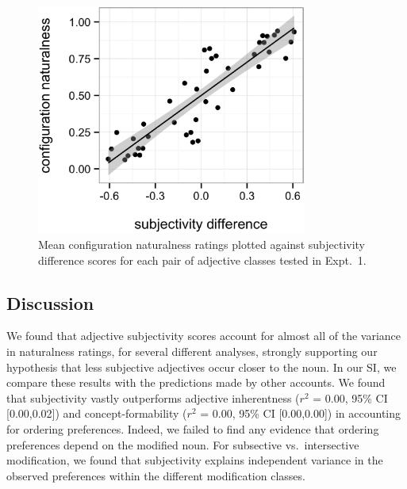 \documentclass[manuscript]{stjour}
\begin{document}
\begin{figure}
	\centering\includegraphics[width=3.5in]{plots/naturalness-subjectivity-configuration.eps}
	\caption{Mean configuration naturalness ratings plotted against subjectivity difference scores for each pair of adjective classes tested in Expt.~1.}\label{naturalness-subjectivity}
\end{figure}


\subsection{Discussion}

We found that adjective subjectivity scores account for almost all of the variance in naturalness ratings, for several different analyses, strongly supporting our hypothesis that less subjective adjectives occur closer to the noun. {In our SI, we compare these results with the predictions made by other accounts. We found that subjectivity vastly outperforms adjective inherentness ($r^{2}$ = 0.00, 95\% CI [0.00,0.02]) and concept-formability ($r^{2}$ = 0.00, 95\% CI [0.00,0.00]) in accounting for ordering preferences. Indeed, we failed to find any evidence that ordering preferences depend on the modified noun. For subsective vs.\ intersective modification, we found that subjectivity explains independent variance in the observed preferences within the different modification classes.}
\end{document}
